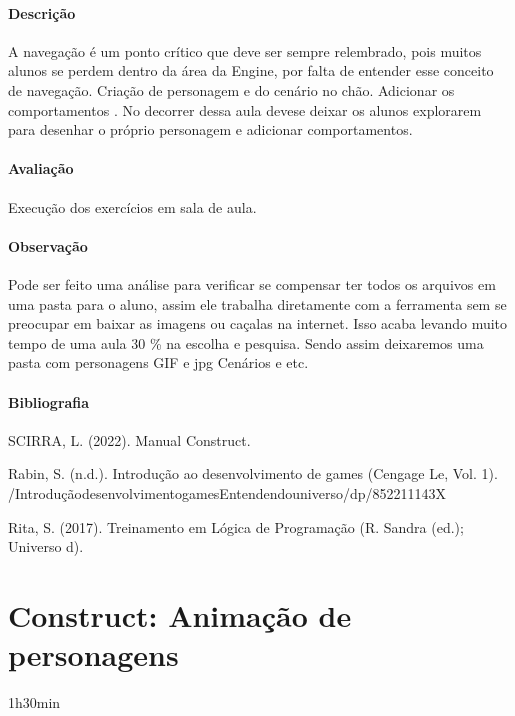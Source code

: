\documentclass[letterpaper,10pt,brazil]{sphinxmanual}
\begin{document}
\subsubsection*{Descrição}

\sphinxAtStartPar
A navegação é um ponto crítico que deve ser sempre relembrado, pois muitos alunos se
perdem dentro da área da Engine, por falta de entender esse conceito de navegação.
Criação de personagem e do cenário no chão. Adicionar os comportamentos .
No decorrer dessa aula deve\sphinxhyphen{}se deixar os alunos explorarem para desenhar o próprio
personagem e adicionar comportamentos.
\subsubsection*{Avaliação}

\sphinxAtStartPar
Execução dos exercícios em sala de aula.
\subsubsection*{Observação}

\sphinxAtStartPar
Pode ser feito uma análise para verificar se compensar ter todos os arquivos em uma
pasta para o aluno, assim ele trabalha diretamente com a ferramenta sem se preocupar em
baixar as imagens ou caçalas na internet. Isso acaba levando muito tempo de uma aula 30
\% na escolha e pesquisa. Sendo assim deixaremos uma pasta com personagens GIF e jpg
Cenários e etc.
\subsubsection*{Bibliografia}

\sphinxAtStartPar
SCIRRA, L. (2022). Manual Construct.

\sphinxAtStartPar
Rabin, S. (n.d.). Introdução ao desenvolvimento de games (Cengage Le, Vol. 1).
/Introdução\sphinxhyphen{}desenvolvimento\sphinxhyphen{}games\sphinxhyphen{}Entendendo\sphinxhyphen{}universo/dp/852211143X

\sphinxAtStartPar
Rita, S. (2017). Treinamento em Lógica de Programação (R. Sandra (ed.); Universo d).

\sphinxstepscope


\chapter{Construct: Animação de personagens}
\label{\detokenize{modelo_aula_07:construct-animacao-de-personagens}}\label{\detokenize{modelo_aula_07::doc}}
\sphinxAtStartPar
{} 1h30min
\end{document}
